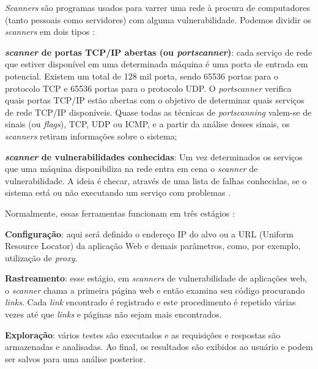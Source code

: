 \textit{Scanners} são programas usados para varrer uma rede à procura de computadores (tanto pessoais como servidores) com alguma vulnerabilidade. Podemos dividir os \textit{scanners} em dois tipos \cite{univhacker}: 

\begin{alineas}
\item \textbf{\textit{scanner} de portas TCP/IP abertas (ou \textit{portscanner})}: cada serviço de rede que estiver disponível em uma determinada máquina é uma porta de entrada em potencial. Existem um total de 128 mil porta, sendo 65536 portas para o protocolo TCP e 65536 portas para o protocolo UDP. O \textit{portscanner} verifica quais portas TCP/IP estão abertas com o objetivo de determinar quais serviços de rede TCP/IP disponíveis. Quase todas as técnicas de \textit{portscanning} valem-se de sinais (ou \textit{flags}), TCP, UDP ou ICMP, e a partir da análise desses sinais, os \textit{scanners} retiram informações sobre o sistema; \cite{univhacker}
\item \textbf{\textit{scanner} de vulnerabilidades conhecidas}: Um vez determinados os serviços que uma máquina disponibiliza na rede entra em cena o \textit{scanner} de vulnerabilidade. A ideia é checar, através de uma lista de falhas conhecidas, se o sistema está ou não executando um serviço com problemas \cite{univhacker}. 
\end{alineas}

Normalmente, essas ferramentas funcionam em três estágios \cite{avaliacao:tania}:

\begin{alineas}
 \item \textbf{Configuração}: aqui será definido o endereço IP do alvo ou a URL (Uniform Resource Locator) da aplicação Web e demais parâmetros, como, por exemplo, utilização de \textit{proxy}.
 \item \textbf{Rastreamento}: esse estágio, em \textit{scanners} de vulnerabilidade de aplicações web, o \textit{scanner} chama a primeira página web e então examina seu código procurando \textit{links}. Cada \textit{link} encontrado é registrado e este procedimento é repetido várias vezes até que \textit{links} e páginas não sejam mais encontrados.
 \item \textbf{Exploração}: vários testes são executados e as requisições e respostas são armazenadas e analisadas. Ao final, os resultados são exibidos ao usuário e podem ser salvos para uma análise posterior. 
\end{alineas}

